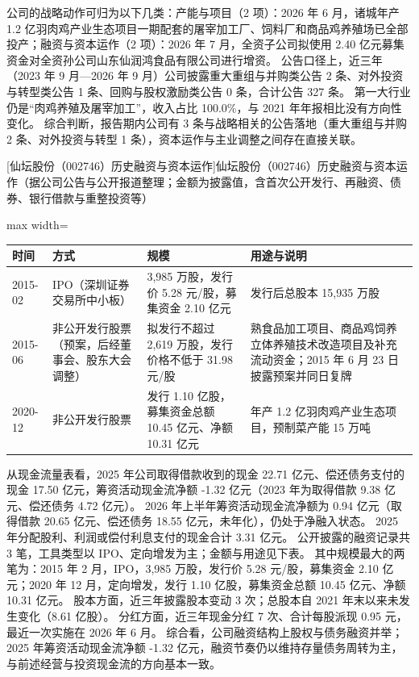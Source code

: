  公司的战略动作可归为以下几类：产能与项目（2 项）：2026 年 6 月，诸城年产 1.2 亿羽肉鸡产业生态项目一期配套的屠宰加工厂、饲料厂和商品鸡养殖场已全部投产；融资与资本运作（2 项）：2026 年 7 月，全资子公司拟使用 2.40 亿元募集资金对全资孙公司山东仙润鸿食品有限公司进行增资。 公告口径上，近三年（2023 年 9 月---2026 年 9 月）公司披露重大重组与并购类公告 2 条、对外投资与转型类公告 1 条、回购与股权激励类公告 0 条，合计公告 327 条。 第一大行业仍是“肉鸡养殖及屠宰加工”，收入占比 100.0\%，与 2021 年年报相比没有方向性变化。 综合判断，报告期内公司有 3 条与战略相关的公告落地（重大重组与并购 2 条、对外投资与转型 1 条），资本运作与主业调整之间存在直接关联。

\begin{center}\small\setlength{\tabcolsep}{4pt}
[仙坛股份（002746）历史融资与资本运作]{仙坛股份（002746）历史融资与资本运作（据公司公告与公开报道整理；金额为披露值，含首次公开发行、再融资、债券、银行借款与重整投资等）}
\begin{adjustbox}{max width=\textwidth}
\begin{tabular}{@{}p{1.45cm}p{2.55cm}p{4.05cm}p{4.95cm}@{}}
\toprule
时间 & 方式 & 规模 & 用途与说明 \\
\midrule
2015-02 & IPO（深圳证券交易所中小板） & 3,\allowbreak{}985 万股，\allowbreak{}发行价 5.28 元/\allowbreak{}股，\allowbreak{}募集资金 2.10 亿元 & 发行后总股本 15,\allowbreak{}935 万股 \\
2015-06 & 非公开发行股票（预案，后经董事会、股东大会调整） & 拟发行不超过 2,\allowbreak{}619 万股，\allowbreak{}发行价格不低于 31.98 元/\allowbreak{}股 & 熟食品加工项目、\allowbreak{}商品鸡饲养立体养殖技术改造项目及补充流动资金；2015 年 6 月 23 日披露预案并同日复牌 \\
2020-12 & 非公开发行股票 & 发行 1.10 亿股，\allowbreak{}募集资金总额 10.45 亿元、\allowbreak{}净额 10.31 亿元 & 年产 1.2 亿羽肉鸡产业生态项目，\allowbreak{}预制菜产能 15 万吨 \\
\bottomrule
\end{tabular}
\end{adjustbox}
\end{center}

 从现金流量表看，2025 年公司取得借款收到的现金 22.71 亿元、偿还债务支付的现金 17.50 亿元，筹资活动现金流净额 -1.32 亿元（2023 年为取得借款 9.38 亿元、偿还债务 4.72 亿元）。 2026 年上半年筹资活动现金流净额为 0.94 亿元（取得借款 20.65 亿元、偿还债务 18.55 亿元，未年化），仍处于净融入状态。 2025 年分配股利、利润或偿付利息支付的现金合计 3.31 亿元。 公开披露的融资记录共 3 笔，工具类型以 IPO、定向增发为主；金额与用途见下表。 其中规模最大的两笔为：2015 年 2 月，IPO，3,985 万股，发行价 5.28 元/股，募集资金 2.10 亿元；2020 年 12 月，定向增发，发行 1.10 亿股，募集资金总额 10.45 亿元、净额 10.31 亿元。 股本方面，近三年披露股本变动 3 次；总股本自 2021 年末以来未发生变化（8.61 亿股）。 分红方面，近三年现金分红 7 次、合计每股派现 0.95 元，最近一次实施在 2026 年 6 月。 综合看，公司融资结构上股权与债务融资并举；2025 年筹资活动现金流净额 -1.32 亿元，融资节奏仍以维持存量债务周转为主，与前述经营与投资现金流的方向基本一致。

